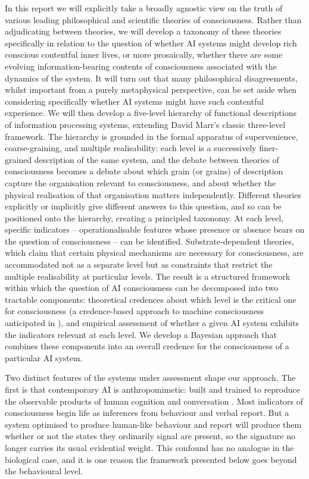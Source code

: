 \documentclass[11pt, a4paper, onecolumn, gdm]{google}
\begin{document}
In this report we will explicitly take a broadly agnostic view on the truth of various leading philosophical and scientific theories of consciousness.
Rather than adjudicating between theories, we will develop a taxonomy of these theories specifically in relation to the question of whether AI systems might develop rich conscious contentful inner lives, or more prosaically, whether there are some evolving information-bearing contents of consciousness associated with the dynamics of the system.
It will turn out that many philosophical disagreements, whilst important from a purely metaphysical perspective, can be set aside when considering specifically whether AI systems might have such contentful experience.
We will then develop a five-level hierarchy of functional descriptions of information processing systems, extending David Marr's classic three-level framework.
The hierarchy is grounded in the formal apparatus of supervenience, coarse-graining, and multiple realisability: each level is a successively finer-grained description of the same system, and the debate between theories of consciousness becomes a debate about which grain (or grains) of description capture the organisation relevant to consciousness, and about whether the physical realisation of that organisation matters independently.
Different theories explicitly or implicitly give different answers to this question, and so can be positioned onto the hierarchy, creating a principled taxonomy.
At each level, specific indicators -- operationalisable features whose presence or absence bears on the question of consciousness -- can be identified.
Substrate-dependent theories, which claim that certain physical mechanisms are necessary for consciousness, are accommodated not as a separate level but as constraints that restrict the multiple realisability at particular levels.
The result is a structured framework within which the question of AI consciousness can be decomposed into two tractable components: theoretical credences about which level is the critical one for consciousness (a credence-based approach to machine consciousness anticipated in \citealp{seth2009}), and empirical assessment of whether a given AI system exhibits the indicators relevant at each level.
We develop a Bayesian approach that combines these components into an overall credence for the consciousness of a particular AI system.

Two distinct features of the systems under assessment shape our approach.
The first is that contemporary AI is anthropomimetic: built and trained to reproduce the observable products of human cognition and conversation \citetext{\citealp{shevlin2026}; see also \citealp{schwitzgebel2024,seth2024}}.
Most indicators of consciousness begin life as inferences from behaviour and verbal report.
But a system optimised to produce human-like behaviour and report will produce them whether or not the states they ordinarily signal are present, so the signature no longer carries its usual evidential weight.
This confound has no analogue in the biological case, and it is one reason the framework presented below goes beyond the behavioural level.
\end{document}

